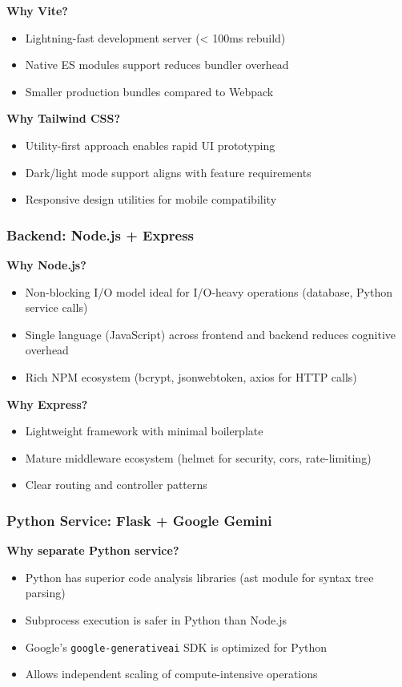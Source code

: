 \documentclass[12pt,a4paper,oneside]{article}
\begin{document}
\textbf{Why Vite?}
\begin{itemize}
    \item Lightning-fast development server (< 100ms rebuild)
    \item Native ES modules support reduces bundler overhead
    \item Smaller production bundles compared to Webpack
\end{itemize}

\textbf{Why Tailwind CSS?}
\begin{itemize}
    \item Utility-first approach enables rapid UI prototyping
    \item Dark/light mode support aligns with feature requirements
    \item Responsive design utilities for mobile compatibility
\end{itemize}

\subsubsection{Backend: Node.js + Express}

\textbf{Why Node.js?}
\begin{itemize}
    \item Non-blocking I/O model ideal for I/O-heavy operations (database, Python service calls)
    \item Single language (JavaScript) across frontend and backend reduces cognitive overhead
    \item Rich NPM ecosystem (bcrypt, jsonwebtoken, axios for HTTP calls)
\end{itemize}

\textbf{Why Express?}
\begin{itemize}
    \item Lightweight framework with minimal boilerplate
    \item Mature middleware ecosystem (helmet for security, cors, rate-limiting)
    \item Clear routing and controller patterns
\end{itemize}

\subsubsection{Python Service: Flask + Google Gemini}

\textbf{Why separate Python service?}
\begin{itemize}
    \item Python has superior code analysis libraries (ast module for syntax tree parsing)
    \item Subprocess execution is safer in Python than Node.js
    \item Google's \texttt{google-generativeai} SDK is optimized for Python
    \item Allows independent scaling of compute-intensive operations
\end{itemize}
\end{document}
